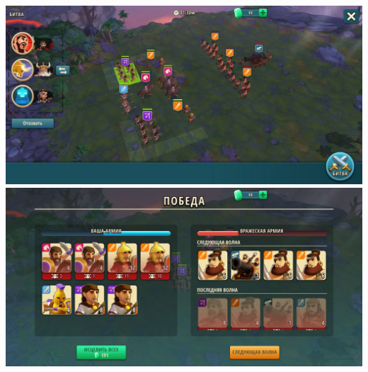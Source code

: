 \noindent\includegraphics[width=\linewidth]{./parts/media/TreasureHunt/36/sargon/photo_2022-04-07_13-16-43.jpg} \newline
\noindent\includegraphics[width=\linewidth]{./parts/media/TreasureHunt/36/sargon/photo_2022-04-07_13-16-40.jpg} \newline

